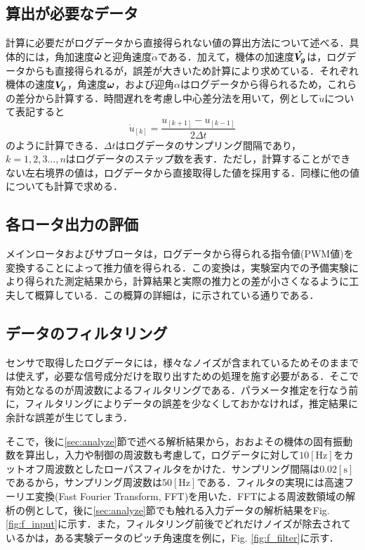 \subsection{算出が必要なデータ}

計算に必要だがログデータから直接得られない値の算出方法について述べる．具体的には，角加速度$\mbox{\boldmath $\dot{\omega}$}$と迎角速度$\dot{\alpha}$である．加えて，機体の加速度$\mbox{\boldmath $\dot{V_g}$}$は，ログデータからも直接得られるが，誤差が大きいため計算により求めている．それぞれ機体の速度$\mbox{\boldmath $V_g$}$，角速度$\mbox{\boldmath $\omega$}$，および迎角$\alpha$はログデータから得られるため，これらの差分から計算する．時間遅れを考慮し中心差分法を用いて，例として$\dot{u}$について表記すると
\begin{equation}
  \dot{u}_{[k]} = \dfrac{u_{[k+1]}-u_{[k-1]}}{2\Delta t}
\end{equation}
のように計算できる\cite{kawata}．$\Delta t$はログデータのサンプリング間隔であり，$k=1,2,3\hdots,n$はログデータのステップ数を表す．ただし，計算することができない左右境界の値は，ログデータから直接取得した値を採用する．同様に他の値についても計算で求める．

\subsection{各ロータ出力の評価}

メインロータおよびサブロータは，ログデータから得られる指令値(PWM値)を変換することによって推力値を得られる．この変換は，実験室内での予備実験により得られた測定結果から，計算結果と実際の推力との差が小さくなるように工夫して概算している．この概算の詳細は，\cite{yoshikawa}に示されている通りである．

\subsection{データのフィルタリング}
\label{sec:filter}

センサで取得したログデータには，様々なノイズが含まれているためそのままでは使えず，必要な信号成分だけを取り出すための処理を施す必要がある．そこで有効となるのが周波数によるフィルタリングである．パラメータ推定を行なう前に，フィルタリングによりデータの誤差を少なくしておかなければ，推定結果に余計な誤差が生じてしまう．

そこで，後に\ref{sec:analyze}節で述べる解析結果から，おおよその機体の固有振動数を算出し，入力や制御の周波数も考慮して，ログデータに対して$10\mathrm{[Hz]}$をカットオフ周波数としたローパスフィルタをかけた．サンプリング間隔は$0.02\mathrm{[s]}$であるから，サンプリング周波数は$50\mathrm{[Hz]}$である．フィルタの実現には高速フーリエ変換(Fast Fourier Transform, FFT)を用いた．FFTによる周波数領域の解析の例として，後に\ref{sec:analyze}節でも触れる入力データの解析結果をFig. \ref{fig:f_input}に示す．また，フィルタリング前後でどれだけノイズが除去されているかは，ある実験データのピッチ角速度を例に，Fig. \ref{fig:f_filter}に示す．

